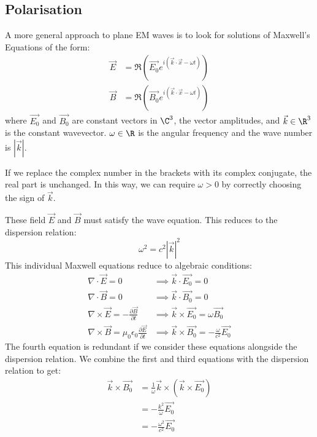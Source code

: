 \documentclass[../Main.tex]{subfiles}
\begin{document}
\subsection{Polarisation}
A more general approach to plane EM waves is to look for solutions of Maxwell's Equations of the form:
\begin{align*}
    \vec{E} &= \Re(\vec{E_0} e^{i(\vec{k} \cdot \vec{x} - \omega t)}) \\
    \vec{B} &= \Re(\vec{B_0} e^{i(\vec{k} \cdot \vec{x} - \omega t)})
\end{align*}
where $\vec{E_0}$ and $\vec{B_0}$ are constant vectors in $\C^3$, the vector amplitudes, and $\vec{k} \in \R^3$ is the constant wavevector. $\omega \in \R$ is the angular frequency and the wave number is $|\vec{k}|$.

\begin{remark}
    If we replace the complex number in the brackets with its complex conjugate, the real part is unchanged. In this way, we can require $\omega > 0$ by correctly choosing the sign of $\vec{k}$.
\end{remark}

These field $\vec{E}$ and $\vec{B}$ must satisfy the wave equation. This reduces to the dispersion relation:
\begin{equation*}
    \omega^2 = c^2 |\vec{k}|^2
\end{equation*}
This individual Maxwell equations reduce to algebraic conditions:
\begin{align*}
    \nabla \cdot \vec{E} = 0 &\implies \vec{k} \cdot \vec{E_0} = 0 \\
    \nabla \cdot \vec{B} = 0 &\implies \vec{k} \cdot \vec{B_0} = 0 \\
    \nabla \times \vec{E} = -\frac{\partial \vec{B}}{\partial t} &\implies \vec{k} \times \vec{E_0} = \omega \vec{B_0} \\
    \nabla \times \vec{B} = \mu_0 \epsilon_0 \frac{\partial \vec{E}}{\partial t} &\implies \vec{k} \times \vec{B_0} = -\frac\omega{c^2} \vec{E_0}
\end{align*}
The fourth equation is redundant if we consider these equations alongside the dispersion relation. We combine the first and third equations with the dispersion relation to get:
\begin{align*}
    \vec{k} \times \vec{B_0} &= \frac{1}{\omega} \vec{k} \times (\vec{k} \times \vec{E_0}) \\
    &= -\frac{k^2}{\omega} \vec{E_0} \\
    &= - \frac{\omega^2}{c^2}\vec{E_0}
\end{align*}
\end{document}

